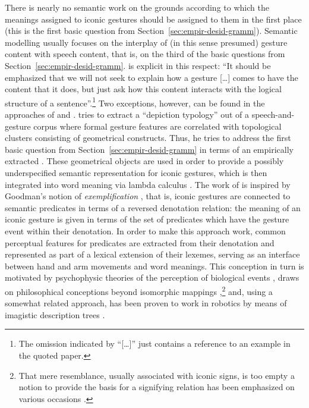 \documentclass[output=paper
 	        ,biblatex
                ,babelshorthands
                ,newtxmath
                ,draftmode
                ,colorlinks, citecolor=brown
]{langscibook}
\begin{document}
There is nearly no semantic work on the grounds according to which the meanings assigned to iconic gestures should be assigned to them in the first place (this is the first basic question from Section~\ref{sec:empir-desid-gramm}).
%
Semantic modelling usually focuses on the interplay of (in this sense presumed) gesture content with speech content, that is, on the third of the basic questions from Section~\ref{sec:empir-desid-gramm}.
%
\citet[]{Schlenker:2018} is explicit in this respect: \enquote{It should be emphasized that we will not seek to explain how a gesture [\ldots] comes to have the content that it does, but just ask how this content interacts with the logical structure of a sentence}.\footnote{The omission indicated by \enquote{[\ldots]} just contains a reference to an example in the quoted paper.}
%
Two exceptions, however, can be found in the approaches of \citet{Rieser:2010} and \citet{Luecking:2013:a,Luecking:2016}.
%
\citet{Rieser:2010} tries to extract a \enquote{depiction typology} out of a speech-and-gesture corpus where formal gesture features are correlated with topological clusters consisting of geometrical constructs. 
%
Thus, he tries to address the first basic question from Section~\ref{sec:empir-desid-gramm} in terms of an empirically extracted .
%
These geometrical objects are used in order to provide a possibly underspecified semantic representation for iconic gestures, which is then integrated into word meaning via lambda calculus \citep{Hahn:Rieser:2010,Rieser:2011}.
%
The work of \citet{Luecking:2013:a,Luecking:2016} is inspired by Goodman's notion of \emph{exemplification} \citep{Goodman:1976}, that is, iconic gestures are connected to semantic predicates in terms of a reversed denotation relation: the meaning of an iconic gesture is given in terms of the set of predicates which have the gesture event within their denotation.
%
In order to make this approach work, common perceptual features for predicates are extracted from their denotation and represented as part of a lexical extension of their lexemes, serving as an interface between hand and arm movements and word meanings. 
%
This conception in turn is motivated by psychophysic theories of the perception of biological events \citep{Johansson:1973}, draws on philosophical  conceptions beyond isomorphic mappings \citep{Peacocke:1987},\footnote{\label{fn:resemblance}That mere resemblance, usually associated with iconic signs, is too empty a notion to provide the basis for a signifying relation has been emphasized on various occasions \citep{Burks:1949,Bierman:1962,Eco:1976,Goodman:1976,Sonesson:1998}.} and, using a somewhat related approach, has been proven to work in robotics by means of imagistic description trees \citep{Sowa:2006:a}.
\end{document}
